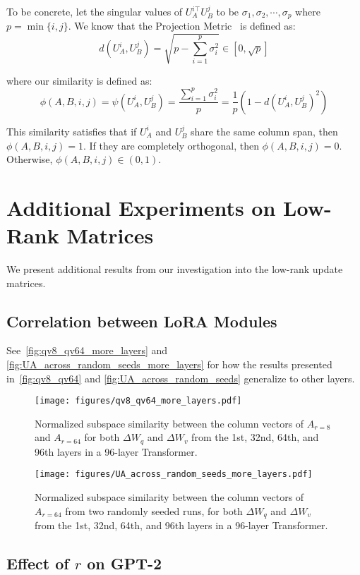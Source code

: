 To be concrete, let the singular values of $ U_A^{i\top } U_B^j$ to be $\sigma_1, \sigma_2, \cdots, \sigma_{p}$ where $p = \min \{i, j \}$. We know that the Projection Metric~\cite{dist} is defined as:
$$d(U_A^i, U_B^j) = \sqrt{ p - \sum_{i = 1}^p \sigma_i^2} \in [0, \sqrt{p}]$$

where our similarity is defined as:
$$\phi(A, B, i, j) = \psi(U_A^i, U_B^j) = \frac{\sum_{i = 1}^p \sigma_i^2}{p}= \frac{1}{p} \left( 1 - d(U_A^i, U_B^j)^2 \right)$$

This similarity satisfies that if $U_A^i$ and $U_B^j$ share the same column span, then $\phi(A, B, i, j) = 1$.
If they are completely orthogonal, then $\phi(A, B, i, j) = 0$. Otherwise, $\phi(A, B, i, j) \in (0, 1)$.



\section{Additional Experiments on Low-Rank Matrices}
We present additional results from our investigation into the low-rank update matrices.
\subsection{Correlation between LoRA Modules}
\label{app:corr_lora}
See~\autoref{fig:qv8_qv64_more_layers} and \autoref{fig:UA_across_random_seeds_more_layers} for how the results presented in~\autoref{fig:qv8_qv64} and \autoref{fig:UA_across_random_seeds} generalize to other layers.
\begin{figure}[h]
  \centering
    \texttt{[image: figures/qv8\_qv64\_more\_layers.pdf]}
    \caption{Normalized subspace similarity between the column vectors of $A_{r=8}$ and $A_{r=64}$ for both $\Delta W_q$ and $\Delta W_v$ from the 1st, 32nd, 64th, and 96th layers in a 96-layer Transformer.}
    \label{fig:qv8_qv64_more_layers}
\end{figure}

\begin{figure}[h]
  \centering
    \texttt{[image: figures/UA\_across\_random\_seeds\_more\_layers.pdf]}
    \caption{Normalized subspace similarity between the column vectors of $A_{r=64}$ from two randomly seeded runs, for both $\Delta W_q$ and $\Delta W_v$ from the 1st, 32nd, 64th, and 96th layers in a 96-layer Transformer.}
    \label{fig:UA_across_random_seeds_more_layers}
\end{figure}

\subsection{Effect of $r$ on GPT-2}
\label{app:gpt2_effect_r}

